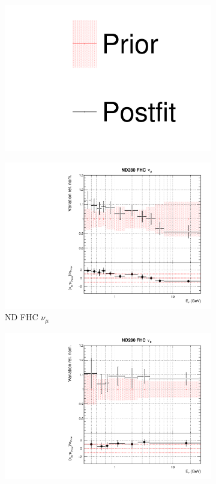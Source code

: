 \begin{figure}
\centering
\begin{subfigure}{0.95\textwidth}
  \centering
  \includegraphics[width=0.24\linewidth]{figs/dat_leg}
\end{subfigure}
\begin{subfigure}{0.24\textwidth}
  \centering
  \includegraphics[width=0.95\linewidth]{figs/datflux0}
  \caption{ND FHC $\nu_{\mu}$}
  \label{fig:}
\end{subfigure}
\begin{subfigure}{0.24\textwidth}
  \centering
  \includegraphics[width=0.95\linewidth]{figs/datflux1}

\end{subfigure}
\end{figure}
